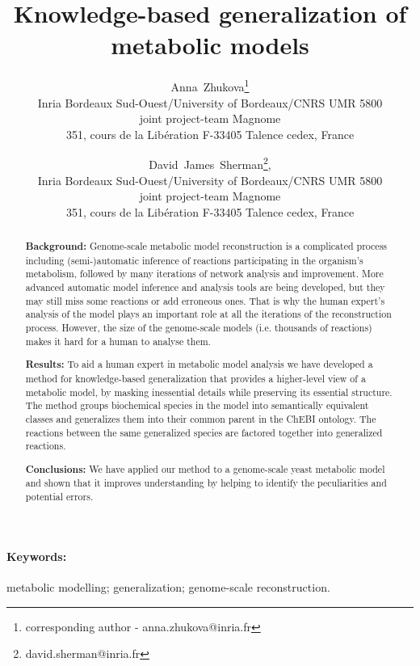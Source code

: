 \documentclass[9pt]{article}
\title{Knowledge-based generalization of metabolic models}
\author{Anna~Zhukova\thanks{corresponding author - anna.zhukova@inria.fr}\\ Inria Bordeaux Sud-Ouest/University of Bordeaux/CNRS UMR 5800\\
joint project-team Magnome\\
351, cours de la Lib\'{e}ration F-33405 Talence cedex, France
        \and David~James~Sherman\thanks{david.sherman@inria.fr}, \\ Inria Bordeaux Sud-Ouest/University of Bordeaux/CNRS UMR 5800\\
        joint project-team Magnome\\
351, cours de la Lib\'{e}ration F-33405 Talence cedex, France}
\date{}
\begin{document}
\maketitle
\newpage

\begin{abstract}
{\bf Background:} Genome-scale metabolic model reconstruction is a complicated process including (semi-)automatic inference of reactions participating in the organism's metabolism, followed by many iterations of network analysis and improvement. More advanced automatic model inference and analysis tools are being developed, but they may still miss some reactions or add erroneous ones. That is why the human expert's analysis of the model plays an important role at all the iterations of the reconstruction process. However, the size of the genome-scale models (i.e. thousands of reactions) makes it hard for a human to analyse them.

{\bf Results:} To aid a human expert in metabolic model analysis we have developed a method for knowledge-based generalization that provides a higher-level view of a metabolic model, by masking inessential details while preserving its essential structure. The method groups biochemical species in the model into semantically equivalent classes and generalizes them into their common parent in the ChEBI ontology. The reactions between the same generalized species are factored together into generalized reactions.

{\bf Conclusions:} We have applied our method to a genome-scale yeast metabolic model and shown that it improves understanding by helping to identify the peculiarities and potential errors.      
\end{abstract}

\paragraph*{Keywords:}metabolic modelling; generalization; genome-scale reconstruction.

\newpage
\end{document}
